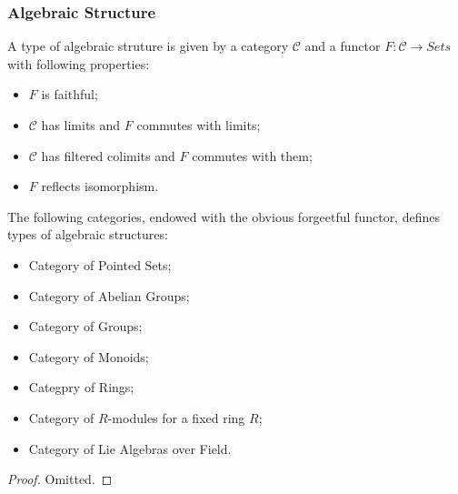 \documentclass[Total.tex]{subfiles}
\begin{document}
				\subsubsection{Algebraic Structure}
					\begin{Def}
						A type of algebraic struture is given by a category $\mathcal{C}$ and a functor $F:\mathcal{C}\rightarrow Sets$ with following properties:
						\begin{itemize}
							\item $F$ is faithful;
							\item $\mathcal{C}$ has limits and $F$ commutes with limits;
							\item $\mathcal{C}$ has filtered colimits and $F$ commutes with them;
							\item $F$ reflects isomorphism.
						\end{itemize}
					\end{Def}
					\begin{lemma}
						The following categories, endowed with the obvious forgeetful functor, defines types of algebraic structures:
						\begin{itemize}
							\item Category of Pointed Sets;
							\item Category of Abelian Groups;
							\item Category of Groups;
							\item Category of Monoids;
							\item Categpry of Rings;
							\item Category of $R$-modules for a fixed ring $R$;
							\item Category of Lie Algebras over Field.
						\end{itemize}
					\end{lemma}
					\begin{proof}
						Omitted.
					\end{proof}
					
\end{document}
